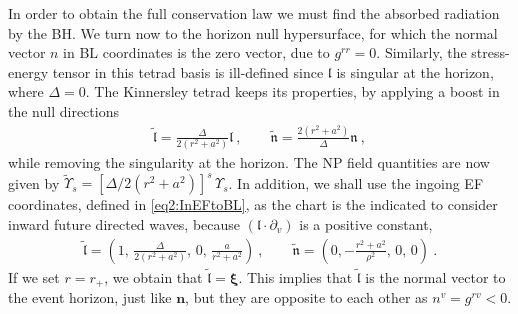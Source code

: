 In order to obtain the full conservation law we must find the absorbed radiation by the BH. We turn now to the horizon null hypersurface, for which the normal vector $n$ in BL coordinates is the zero vector, due to $g^{rr}=0$.
Similarly, the stress-energy tensor in this tetrad basis is ill-defined since $\bm{\mathfrak{l}}$ is singular at the horizon, where $\Delta=0$.
The Kinnersley tetrad keeps its properties, by applying a boost in the null directions \cite{Hawking1972,Brito2015,Teukolsky1974, Townsend1997}
\begin{align}
   \bm{\tilde{\mathfrak{l}}} = \frac{\Delta}{2 (r^2+a^2)} \bm{\mathfrak{l}} ~,\qquad \bm{\tilde{\mathfrak{n}}} = \frac{2 (r^2+a^2)}{\Delta} \bm{\mathfrak{n}} ~,
\end{align}
while removing the singularity at the horizon. The NP field quantities are now given by $\tilde{\Upsilon}_s = [\Delta/2(r^2+a^2)]^s \,\Upsilon_s$.
In addition, we shall use the ingoing EF coordinates, defined in \eqref{eq2:InEFtoBL}, as the chart is the indicated to consider inward future directed waves, because $(\bm{\mathfrak{l}}\cdot\partial_v)$ is a positive constant,
\begin{align}
    \bm{\tilde{\mathfrak{l}}} = \left(1, \,\frac{\Delta}{2(r^2+a^2)}, \,0, \,\frac{a}{r^2 + a^2} \right) ~,\qquad \bm{\tilde{\mathfrak{n}}} = \left(0, -\frac{r^2+a^2}{\rho^2}, \,0, \,0\right) ~.
\end{align}
If we set $r=r_{+}$, we obtain that $\bm{\tilde{\mathfrak{l}}} = \bm{\xi}$.
This implies that $\bm{\tilde{\mathfrak{l}}}$ is the normal vector to the event horizon, just like $\bm{n}$, but they are opposite to each other as $n^v = g^{rv}<0$.

